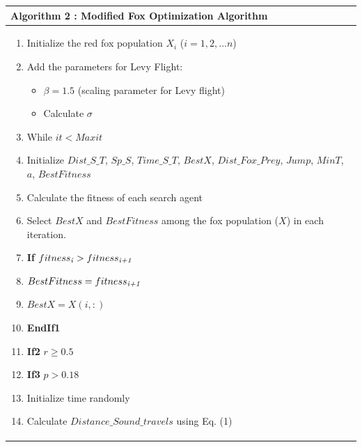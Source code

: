 \documentclass[
]{article}
\begin{document}
\begin{justify}
{\begin{minipage}[t]{\textwidth}
  \begin{longtable}{@{}p{\dimexpr\linewidth-2\tabcolsep\relax}@{}}
  \toprule
  \begin{minipage}[b]{\linewidth}
  \raggedright
  \textbf{Algorithm 2 : Modified Fox Optimization Algorithm}
  \end{minipage} \\
  \midrule
  \endhead
  \begin{minipage}[t]{\linewidth}
  \raggedright
  \begin{enumerate}
    \item Initialize the red fox population $X_i$ ($i=1, 2, ...n$)
    \item Add the parameters for Levy Flight:
      \begin{itemize}
        \item $\beta = 1.5$ (scaling parameter for Levy flight)
        \item Calculate $\sigma$
      \end{itemize}
    \item While $it < Maxit$
    \item \hspace{0.5cm} Initialize $Dist\_S\_T$, $Sp\_S$, $Time\_S\_T$, $BestX$, $Dist\_Fox\_Prey$, $Jump$, $MinT$, $a$, $BestFitness$
    \item \hspace{0.5cm} Calculate the fitness of each search agent
    \item \hspace{0.5cm} Select $BestX$ and $BestFitness$ among the fox population ($X$) in each iteration.
   \item \hspace{0.5cm} \textbf{If} $fitness_{\text{\textit{i}}} > fitness_{\text{\textit{i+1}}}$ 
  \item \hspace{1cm} $BestFitness = fitness_{\text{\textit{i+1}}}$
  \item \hspace{1cm} $BestX=X(i, :)$
  \item \hspace{0.5cm} \textbf{EndIf1}
  \item \hspace{0.5cm} \textbf{If2} $r \geq 0.5$ 
  \item \hspace{1cm} \textbf{If3} $p>0.18$ 
  \item \hspace{1.5cm} Initialize time randomly
  \item \hspace{1.5cm} Calculate $Distance\_Sound\_travels$ using Eq. (1)

\end{enumerate}
\end{minipage}
\end{longtable}
\end{minipage}}
\end{justify}
\end{document}
